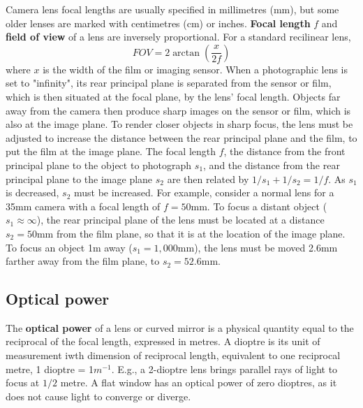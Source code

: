 Camera lens focal lengths are usually specified in millimetres (mm), but some older lenses are marked with centimetres (cm) or inches.
\textbf{Focal length} $f$ and \textbf{field of view} of a lens are inversely proportional. For a standard recilinear lens,
\begin{equation}
    FOV = 2\arctan(\frac{x}{2f})
    \label{eq:fov}
\end{equation}
where $x$ is the width of the film or imaging sensor. When a photographic lens is set to "infinity", its rear principal plane is separated from the sensor or film, which is then situated at the focal plane, by the lens' focal length. Objects far away from the camera then produce sharp images on the sensor or film, which is also at the image plane.
\nl
To render closer objects in sharp focus, the lens must be adjusted to increase the distance between the rear principal plane and the film, to put the film at the image plane. The focal length $f$, the distance from the front principal plane to the object to photograph $s_1$, and the distance from the rear principal plane to the image plane $s_2$ are then related by \(1/s_1 + 1/s_2 = 1/f\).
As $s_1$ is decreased, $s_2$ must be increased. For example, consider a normal lens for a 35mm camera with a focal length of $f=50$mm. To focus a distant object ($s_1 \approx \infty$), the rear principal plane of the lens must be located at a distance $s_2=50$mm from the film plane, so that it is at the location of the image plane. To focus an object 1m away ($s_1 = 1,000$mm), the lens must be moved 2.6mm farther away from the film plane, to $s_2=52.6$mm.

\subsection{Optical power}

The \textbf{optical power} of a lens or curved mirror is a physical quantity equal to the reciprocal of the focal length, expressed in metres. A dioptre is its unit of measurement iwth dimension of reciprocal length, equivalent to one reciprocal metre, 1 dioptre = 1$m^{-1}$. E.g., a 2-dioptre lens brings parallel rays of light to focus at $1/2$ metre. A flat window has an optical power of zero dioptres, as it does not cause light to converge or diverge.

